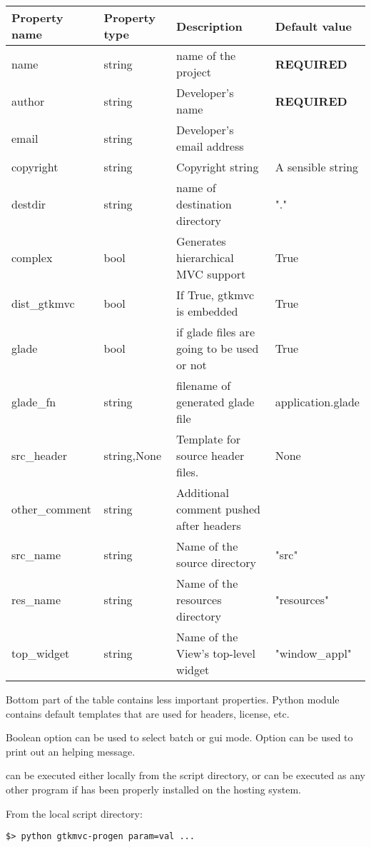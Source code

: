 \begin{center}
\begin{tabular}{|l|l|l|l|}
\hline
Property name& Property type & Description & Default value\\[0.5ex]
\hline
name & string & name of the project & \textbf{REQUIRED} \\
author & string & Developer's name & \textbf{REQUIRED} \\
email & string & Developer's email address & \\
copyright & string & Copyright string & A sensible string\\
destdir & string & name of destination directory & "." \\
complex & bool & Generates hierarchical MVC support & True \\
dist\_gtkmvc & bool & If True, gtkmvc is embedded & True \\
glade & bool & if glade files are going to be used or not & True \\
\hline
glade\_fn & string & filename of generated glade file & application.glade \\
src\_header & string,None & Template for source header files. & None \\
other\_comment & string & Additional comment pushed after headers &  \\ 
src\_name & string & Name of the source directory & "src" \\
res\_name & string & Name of the resources directory & "resources" \\
top\_widget & string & Name of the View's top-level widget & "window\_appl" \\
\hline
\end{tabular} 
\end{center}

Bottom part of the table contains less important properties. Python
module  contains default templates that
are used for headers, license, etc. 

Boolean option  can be used to select batch or gui
mode. Option  can be used to print out an helping message.

\bigskip

 can be executed either locally from the script
directory, or can be executed as any other program if \pygtkmvc has
been properly installed on the hosting system.

From the local script directory:
\begin{verbatim}
$> python gtkmvc-progen param=val ...
\end{verbatim}

